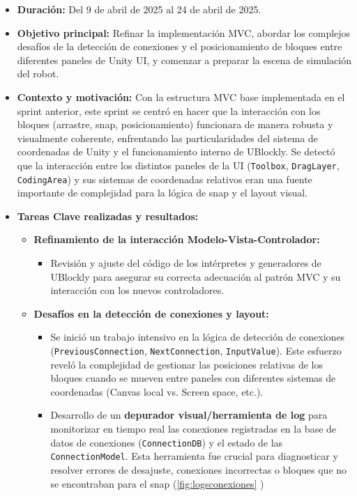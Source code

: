 \begin{itemize}
	\item \textbf{Duración:} Del 9 de abril de 2025 al 24 de abril de 2025.
	\item \textbf{Objetivo principal:} Refinar la implementación MVC, abordar los complejos desafíos de la detección de conexiones y el posicionamiento de bloques entre diferentes paneles de Unity UI, y comenzar a preparar la escena de simulación del robot.
	\item \textbf{Contexto y motivación:} Con la estructura MVC base implementada en el sprint anterior, este sprint se centró en hacer que la interacción con los bloques (arrastre, snap, posicionamiento) funcionara de manera robusta y visualmente coherente, enfrentando las particularidades del sistema de coordenadas de Unity y el funcionamiento interno de UBlockly. Se detectó que la interacción entre los distintos paneles de la UI (\texttt{Toolbox}, \texttt{DragLayer}, \texttt{CodingArea}) y sus sistemas de coordenadas relativos eran una fuente importante de complejidad para la lógica de snap y el layout visual.
	\item \textbf{Tareas Clave realizadas y resultados:}
	\begin{itemize}
		\item \textbf{Refinamiento de la interacción Modelo-Vista-Controlador:}
		\begin{itemize}
			\item Revisión y ajuste del código de los intérpretes y generadores de UBlockly para asegurar su correcta adecuación al patrón MVC y su interacción con los nuevos controladores.
		\end{itemize}
		\item \textbf{Desafíos en la detección de conexiones y layout:}
		\begin{itemize}
			\item Se inició un trabajo intensivo en la lógica de detección de conexiones (\texttt{PreviousConnection}, \texttt{NextConnection}, \texttt{InputValue}). Este esfuerzo reveló la complejidad de gestionar las posiciones relativas de los bloques cuando se mueven entre paneles con diferentes sistemas de coordenadas (Canvas local vs. Screen space, etc.).
			\item Desarrollo de un \textbf{depurador visual/herramienta de log} para monitorizar en tiempo real las conexiones registradas en la base de datos de conexiones (\texttt{ConnectionDB}) y el estado de las \texttt{ConnectionModel}. Esta herramienta fue crucial para diagnosticar y resolver errores de desajuste, conexiones incorrectas o bloques que no se encontraban para el snap (\ref{fig:logsconexiones} )

\end{itemize}
\end{itemize}
\end{itemize}
